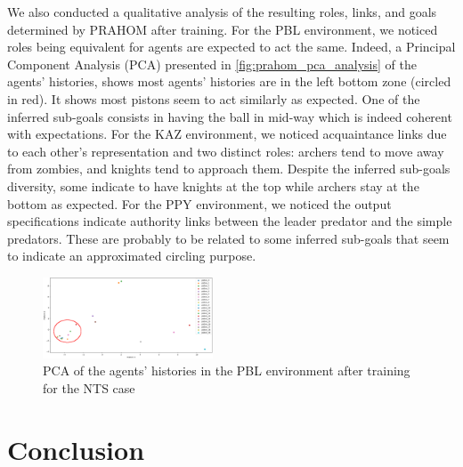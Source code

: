 \documentclass[runningheads]{llncs}
\begin{document}
We also conducted a qualitative analysis of the resulting roles, links, and goals determined by PRAHOM after training.
%
For the PBL environment, we noticed roles being equivalent for agents are expected to act the same. Indeed, a Principal Component Analysis (PCA) presented in \autoref{fig:prahom_pca_analysis} of the agents' histories, shows most agents’ histories are in the left bottom zone (circled in red). It shows most pistons seem to act similarly as expected. One of the inferred sub-goals consists in having the ball in mid-way which is indeed coherent with expectations.
%
For the KAZ environment, we noticed acquaintance links due to each other's representation and two distinct roles: archers tend to move away from zombies, and knights tend to approach them. Despite the inferred sub-goals diversity, some indicate to have knights at the top while archers stay at the bottom as expected.
%
For the PPY environment, we noticed the output specifications indicate authority links between the leader predator and the simple predators. These are probably to be related to some inferred sub-goals that seem to indicate an approximated circling purpose.

\begin{figure}[h!]
    \centering
    \includegraphics[width=0.45\textwidth]{figures/prahom_pca_analysis.png}
    \caption{PCA of the agents' histories in the PBL environment after training for the NTS case}
    \label{fig:prahom_pca_analysis}
\end{figure}



\section{Conclusion}



\end{document}
